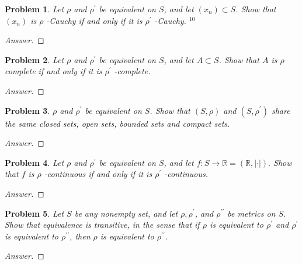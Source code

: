 \documentclass{article}
\newtheorem{problem}{Problem}
\begin{document}
\begin{problem} Let $\rho$ and $\rho^{\prime}$ be equivalent on $S$, and let $\left(x_{n}\right) \subset S$. Show that $\left(x_{n}\right)$ is $\rho$ -Cauchy if and only if it is $\rho^{\prime}$ -Cauchy. $^{10}$
\end{problem}
\begin{proof}[Answer]
    
\end{proof}
\begin{problem} Let $\rho$ and $\rho^{\prime}$ be equivalent on $S$, and let $A \subset S$. Show that $A$ is $\rho$ complete if and only if it is $\rho^{\prime}$ -complete.
\end{problem}
\begin{proof}[Answer]
    
\end{proof}
\begin{problem} $\rho$ and $\rho^{\prime}$ be equivalent on $S$. Show that $(S, \rho)$ and $\left(S, \rho^{\prime}\right)$ share the same closed sets, open sets, bounded sets and compact sets.
\end{problem}
\begin{proof}[Answer]
    
\end{proof}
\begin{problem} Let $\rho$ and $\rho^{\prime}$ be equivalent on $S$, and let $f: S \rightarrow \mathbb{R}=(\mathbb{R},|\cdot|) .$ Show that $f$ is $\rho$ -continuous if and only if it is $\rho^{\prime}$ -continuous.
\end{problem}
\begin{proof}[Answer]
    
\end{proof}
\begin{problem} Let $S$ be any nonempty set, and let $\rho, \rho^{\prime}$, and $\rho^{\prime \prime}$ be metrics on $S$. Show that equivalence is transitive, in the sense that if $\rho$ is equivalent to $\rho^{\prime}$ and $\rho^{\prime}$ is equivalent to $\rho^{\prime \prime}$, then $\rho$ is equivalent to $\rho^{\prime \prime}$.
\end{problem}
\begin{proof}[Answer]
    
\end{proof}
\end{document}
